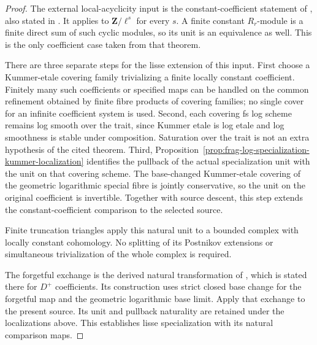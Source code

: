 \documentclass[11pt]{article}
\theoremstyle{definition}
\theoremstyle{remark}
\begin{document}
\begin{proof}
The external local-acyclicity input is the constant-coefficient
statement of \cite[Theorem 3.2]{NakayamaNearby}, also stated in
\cite[Theorem 8.3]{FujiwaraKatoNakayama}.  It applies to
$\mathbf Z/\ell^s$ for every $s$.  A finite constant $R_r$-module
is a finite direct sum of such cyclic modules, so its unit is an
equivalence as well.  This is the only coefficient case taken
from that theorem.

There are three separate steps for the lisse extension of this input.
First choose a Kummer-etale covering family trivializing a finite
locally constant coefficient.  Finitely many such coefficients or
specified maps can be handled on the common refinement obtained by
finite fibre products of covering families; no single cover for an
infinite coefficient system is used.  Second, each covering fs log
scheme remains log smooth over the trait, since Kummer etale is log
etale and log smoothness is stable under composition.  Saturation
over the trait is not an extra hypothesis of the cited theorem.
Third, Proposition~\ref{prop:frag-log-specialization-kummer-localization}
identifies the pullback of the actual specialization unit with the
unit on that covering scheme.  The base-changed Kummer-etale covering
of the geometric logarithmic special fibre is jointly conservative,
so the unit on the original coefficient is invertible.
Together with source descent, this step extends the constant-coefficient
comparison to the selected source.

Finite truncation triangles apply this natural unit to a bounded
complex with locally constant cohomology.  No splitting of its
Postnikov extensions or simultaneous trivialization of the whole
complex is required.

The forgetful exchange is the derived natural transformation of
\cite[\S8.2, (8.2.3)]{FujiwaraKatoNakayama}, which is stated there
for $D^+$ coefficients.
Its construction uses strict closed base change for the forgetful
map and the geometric logarithmic base limit.  Apply that exchange
to the present source.  Its unit and pullback naturality are retained
under the localizations above.  This establishes lisse specialization
with its natural comparison maps.
\end{proof}
\end{document}
